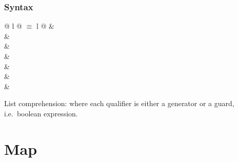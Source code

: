 \begin{isabellebody}
\begin{isamarkuptext}
\subsubsection*{Syntax}

\begin{supertabular}{@ {} l @ {\quad$\equiv$\quad} l @ {}}
 & \\
 & \\
 & \\
 & \\
 &  \\
 & \\
 & \\
\end{supertabular}
\medskip

List comprehension:  where each
qualifier  is either a generator \mbox{} or a
guard, i.e.\ boolean expression.

\section{Map}


\end{isamarkuptext}
\end{isabellebody}
